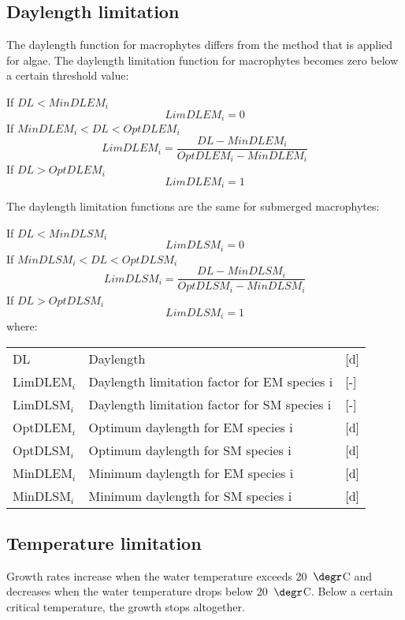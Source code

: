 \subsection{Daylength limitation}
The daylength function for macrophytes differs from the method that is applied for algae. The daylength
limitation function for macrophytes becomes zero below a certain threshold value:

If $DL < MinDLEM_i$
%
\begin{equation}
    LimDLEM_i = 0
\end{equation}
%
If $MinDLEM_i < DL < OptDLEM_i$
%
\begin{equation}
    LimDLEM_i = \frac{DL - MinDLEM_i}{OptDLEM_i - MinDLEM_i}
\end{equation}
%
If $DL > OptDLEM_i$
%
\begin{equation}
    LimDLEM_i = 1
\end{equation}

The daylength limitation functions are the same for submerged macrophytes:

If $DL < MinDLSM_i$
%
\begin{equation}
    LimDLSM_i = 0
\end{equation}
%
If $MinDLSM_i < DL < OptDLSM_i$
%
\begin{equation}
    LimDLSM_i = \frac{DL - MinDLSM_i}{OptDLSM_i - MinDLSM_i}
\end{equation}
%
If $DL > OptDLSM_i$
%
\begin{equation}
    LimDLSM_i = 1
\end{equation}
%
where:
%
\begin{tabular}{lll}
DL                 & Daylength                                      & [d] \\
LimDLEM$_i$        & Daylength limitation factor for EM species i   & [-] \\
LimDLSM$_i$        & Daylength limitation factor for SM species i   & [-] \\
OptDLEM$_i$        & Optimum daylength for EM species i             & [d] \\
OptDLSM$_i$        & Optimum daylength for SM species i             & [d] \\
MinDLEM$_i$        & Minimum daylength for EM species i             & [d] \\
MinDLSM$_i$        & Minimum daylength for SM species i             & [d] \\
\end{tabular}

\subsection{Temperature limitation}
Growth rates increase when the water temperature exceeds 20~$\degr$C and decreases when the water temperature drops
below 20~$\degr$C. Below a certain critical temperature, the growth stops altogether.

